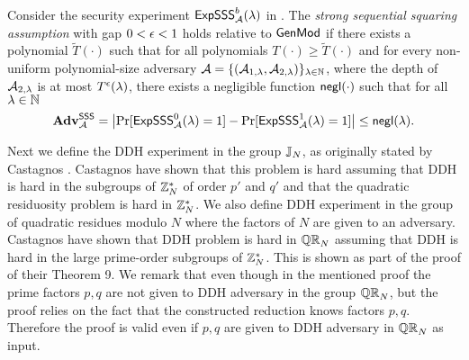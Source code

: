 \begin{definition}\label{def:sssa}
Consider the security experiment $\mathsf{ExpSSS}_{\mathcal{A}}^{b}(\lambda)$ in . The \emph{strong sequential squaring assumption} with gap $0< \epsilon <1$ holds relative to $\mathsf{GenMod}$ if there exists a polynomial $\tilde{T}(\cdot)$ such that for all polynomials $T(\cdot) \geq \tilde{T}(\cdot)$ and for every non-uniform polynomial-size adversary $\mathcal{A} = \{(\mathcal{A}_{1,\lambda}, \mathcal{A}_{2,\lambda})\}_{\lambda \in \mathbb{N}}$, where the depth of $\mathcal{A}_{2,\lambda}$ is at most $T^{\epsilon}(\lambda)$, there exists a negligible function $\mathsf{negl}(\cdot)$ such that for all $\lambda \in \mathbb{N}$ 
\[\mathbf{Adv}^\mathsf{SSS}_{\mathcal{A}} = \left| \Pr[\mathsf{ExpSSS}_{\mathcal{A}}^{0}(\lambda) = 1] - \Pr[\mathsf{ExpSSS}_{\mathcal{A}}^{1}(\lambda) = 1] \right| \leq \mathsf{negl}(\lambda).\]
\end{definition}

Next we define the DDH experiment in the group $\mathbb{J}_N$, as originally stated by Castagnos \etal \cite{C:CouPetPoi16}. Castagnos \etal have shown that this problem is hard assuming that DDH is hard in the subgroups of $\mathbb{Z}_N^*$ of order $p'$ and $q'$ and that the quadratic residuosity problem is hard in $\mathbb{Z}_N^*$.  We also define DDH experiment in the group of quadratic residues modulo $N$ where the factors of $N$ are given to an adversary. Castagnos \etal \cite{C:CouPetPoi16} have shown that DDH problem is hard in $\mathbb{QR}_N$ assuming that DDH is hard in the large prime-order subgroups of $\mathbb{Z}_N^*$. This is shown as part of the proof of their Theorem 9. We remark that even though in the mentioned proof the prime factors $p,q$ are not given to DDH adversary in the group $\mathbb{QR}_N$, but the proof relies on the fact that the constructed reduction knows factors $p, q$. Therefore the proof is valid even if $p,q$ are given to DDH adversary in $\mathbb{QR}_N$ as input.

